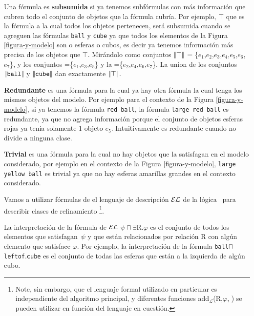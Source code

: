 Una f\'ormula es \textbf{subsumida} si ya tenemos subf\'ormulas con m\'as informaci\'on que cubren todo el conjunto de objetos que 
la f\'ormula cubr\'ia. Por ejemplo, $\top$ que es la f\'ormula a la cual todos los objetos pertenecen, ser\'a subsumida cuando se agreguen 
las f\'ormulas \texttt{ball} y \texttt{cube} ya que todos los elementos de la Figura \ref{figura-y-modelo} son o esferas o cubos, 
es decir ya tenemos informaci\'on m\'as precisa de los objetos que $\top$. Mir\'andolo como conjuntos $|\!|\top|\!|$ = \{$e_1$,$e_2$,$e_3$,$e_4$,$e_5$,$e_6$, $e_7$\}, y los conjuntos =\{$e_1$,$e_3$,$e_5$\} y la =\{$e_2$,$e_4$,$e_6$,$e_7$\}. La union de los conjuntos $|\!|\texttt{ball}|\!|$ y $|\!|\texttt{cube}|\!|$ dan exactamente $|\!|\top|\!|$.

\textbf{Redundante} es una f\'ormula para la cual ya hay otra f\'ormula la cual tenga los mismos objetos del modelo. Por ejemplo para el 
contexto de la Figura \ref{figura-y-modelo}, si ya tenemos la f\'ormula \texttt{red ball}, la f\'ormula \texttt{large red ball} es redundante, ya 
que no agrega informaci\'on porque el conjunto de objetos esferas rojas ya ten\'ia solamente 1 objeto $e_5$. Intuitivamente es redundante cuando no divide a ninguna clase.

\textbf{Trivial} es una f\'ormula para la cual no hay objetos que la satisfagan en el modelo considerado, por ejemplo en el contexto de la 
Figura \ref{figura-y-modelo}, \texttt{large yellow ball} es trivial ya que no hay esferas amarillas grandes en el contexto considerado.

Vamos a utilizar f\'ormulas de el lenguaje de descripci\'on $\mathcal{EL}$ de la l\'ogica~\cite{baad:desc03} para describir clases de refinamiento
 \footnote {Note, sin embargo, que el lenguaje formal utilizado en particular es independiente del algoritmo principal, y diferentes 
funciones add$_{\mathcal {L}}$(R,$\varphi $, \RE) se pueden utilizar en funci\'on del lenguaje en cuesti\'on.}.

La interpretaci\'on de la f\'ormula de $\mathcal{EL}$  $\psi \sqcap \exists $R.$ \varphi$ es el conjunto de todos los elementos que 
satisfagan~$\psi$ y que est\'an relacionados por relaci\'on R con alg\'un elemento que satisface $\varphi $.
Por ejemplo, la interpretaci\'on de la f\'ormula \texttt{ball}$\sqcap$ \texttt{leftof}.\texttt{cube} es el conjunto de todas las esferas 
que est\'an a la izquierda de alg\'un cubo.


